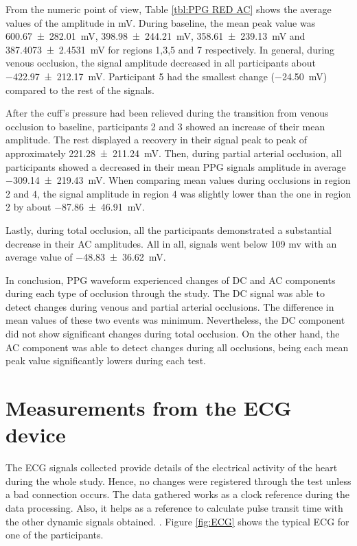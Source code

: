 From the numeric point of view, Table \ref{tbl:PPG RED AC} shows the average values of the amplitude in mV. During baseline, the mean peak value was \SI{600.67(28201)}{\milli\volt}, \SI{398.98(24421)}{\milli\volt}, \SI{358.61(23913)}{\milli\volt} and \SI{387.4073(24531)}{\milli\volt} for regions 1,3,5 and 7 respectively. In general, during venous occlusion, the signal amplitude decreased in all participants about \SI{-422.97(21217)}{\milli\volt}. Participant 5 had the smallest change (\SI{-24.50}{\milli\volt}) compared to the rest of the signals. 

After the cuff's pressure had been relieved during the transition from venous occlusion to baseline, participants 2 and 3 showed an increase of their mean amplitude. The rest displayed a recovery in their signal peak to peak of approximately \SI{221.28(21124)}{\milli\volt}. Then, during partial arterial occlusion, all participants showed a decreased in their mean PPG signals amplitude in average \SI{-309.14(21943)}{\milli\volt}. When comparing mean values during occlusions in region 2 and 4, the signal amplitude in region 4 was slightly lower than the one in region 2 by about \SI{-87.86(4691)}{\milli\volt}. 

Lastly, during total occlusion, all the participants demonstrated a substantial decrease in their AC amplitudes. All in all, signals went below 109 mv with an average value of \SI{-48.83(3662)}{\milli\volt}.

In conclusion, PPG waveform experienced changes of DC and AC components during each type of occlusion through the study. The DC signal was able to detect changes during venous and partial arterial occlusions. The difference in mean values of these two events was minimum. Nevertheless, the DC component did not show significant changes during total occlusion.  On the other hand, the AC component was able to detect changes during all occlusions, being each mean peak value significantly lowers during each test. 

\section{Measurements from the ECG device}
\label{section results 9}
The ECG signals collected provide details of the electrical activity of the heart during the whole study. Hence, no changes were registered through the test unless a bad connection occurs. The data gathered works as a clock reference during the data processing. Also, it helps as a reference to calculate pulse transit time with the other dynamic signals obtained. . Figure \ref{fig:ECG} shows the typical ECG for one of the participants.

